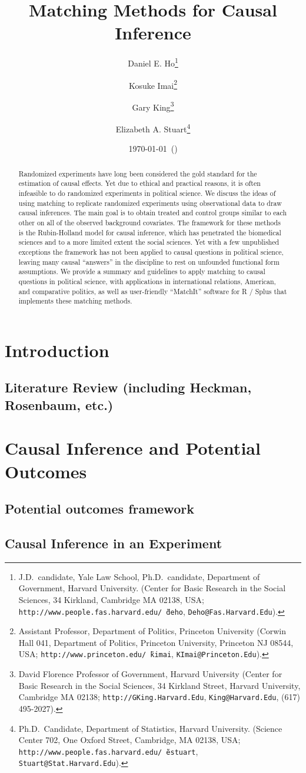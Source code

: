 \documentclass[11pt,titlepage]{article}
\title{Matching Methods for Causal Inference}
\author{Daniel E. Ho\thanks{J.D.\ candidate, Yale Law School, Ph.D.\
    candidate, Department of Government, Harvard
    University. (Center for Basic Research in the Social Sciences, 34
    Kirkland, Cambridge MA 02138, USA;
    \texttt{http://www.people.fas.harvard.edu/\~\,deho},
    \texttt{Deho@Fas.Harvard.Edu}).}
\and %
Kosuke Imai\thanks{Assistant Professor, Department of Politics, Princeton
    University (Corwin Hall 041, Department of Politics, Princeton
    University, Princeton NJ 08544, USA;
    \texttt{http://www.princeton.edu/\~\,kimai},
    \texttt{KImai@Princeton.Edu}).}
\and %
Gary King\thanks{David Florence Professor of Government, Harvard
  University (Center for Basic Research in the Social Sciences, 34
  Kirkland Street, Harvard University, Cambridge MA 02138;
  \texttt{http://GKing.Harvard.Edu}, \texttt{King@Harvard.Edu}, (617)
  495-2027).}
\and %
Elizabeth A. Stuart\thanks{Ph.D.\ Candidate, Department of Statistics, Harvard
  University. (Science Center 702, One Oxford Street, Cambridge, MA
  02138, USA;
  \texttt{http://www.people.fas.harvard.edu/\~\,estuart},
  \texttt{Stuart@Stat.Harvard.Edu}).}}
\date{\today\ (\printtime)}
\begin{document}
\maketitle

\begin{abstract}
Randomized experiments have long  been considered the gold standard
for the estimation of causal effects.  Yet due to 
ethical and practical reasons, it is often infeasible to do randomized
experiments in political science.  We 
discuss the ideas of using matching to replicate randomized
experiments using observational data to draw causal inferences.  The main goal is to obtain 
treated and control groups similar to each other on all of the
observed background covariates.  The framework for 
these methods is the Rubin-Holland model for causal inference, which
has penetrated the biomedical sciences
and to a more limited extent the social sciences.  Yet with a few
unpublished exceptions the framework has not been applied to causal
questions in political science, leaving many causal ``answers'' in the
discipline to rest on unfounded functional form assumptions.  
We provide a summary and guidelines to apply matching
to causal questions in political science, with
applications in international relations, American, and comparative
politics, as well as user-friendly ``MatchIt'' software for R / Splus that
implements these matching methods. 
\end{abstract}

\tableofcontents

\clearpage
\section{Introduction}
\subsection{Literature Review (including Heckman, Rosenbaum, etc.)}
\section{Causal Inference and Potential Outcomes}
\subsection{Potential outcomes framework}
\subsection{Causal Inference in an Experiment}
\end{document}
